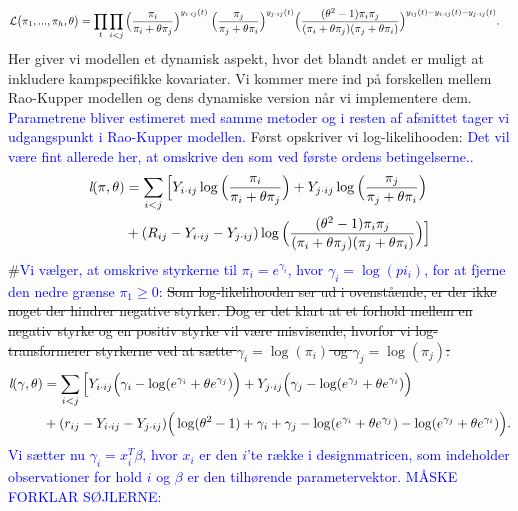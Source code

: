 \documentclass[11pt,a4paper]{article}
\begin{document}
\begin{align*}
\mathcal{L}\big{(}\pi_1,...,\pi_h,\theta\big{)}
&=\prod_t\prod_{i<j}\Big{(}\frac{\pi_i}{\pi_i+\theta\pi_j}\Big{)}^{y_{i\cdot ij}(t)}
\;\Big{(}\frac{\pi_j}{\pi_j+\theta\pi_i}\Big{)}^{y_{j\cdot ij}(t)}
\Big{(}\frac{(\theta^2-1)\pi_i \pi_j}{(\pi_i+\theta\pi_j)(\pi_j+\theta\pi_i)}\Big{)}^{y_{ij}(t)-{y_{i\cdot ij}(t)}-{y_{j\cdot ij}(t)}}.
\end{align*}
Her giver vi modellen et dynamisk aspekt, hvor det blandt andet er muligt at inkludere kampspecifikke kovariater. Vi kommer mere ind på forskellen mellem Rao-Kupper modellen og dens dynamiske version når vi implementere dem. \textcolor{blue}{Parametrene bliver estimeret med samme metoder og i resten af afsnittet tager vi udgangspunkt i Rao-Kupper modellen.} 
Først opskriver vi log-likelihooden: 
\textcolor{blue}{Det vil være fint allerede her, at omskrive den som ved første ordens betingelserne..}
\begin{align*}
\textit{l}(\pi,\theta)
&=\sum_{i<j}\Big{[}Y_{i\cdot ij}\log\Big{(}\frac{\pi_i}{\pi_i+\theta\pi_j}\Big{)}
+ Y_{j\cdot ij}\log\Big{(}\frac{\pi_j}{\pi_j+\theta\pi_i}\Big{)}\\
&+ (R_{ij}-Y_{i\cdot ij}-Y_{j\cdot ij}) \log\Big{(}\frac{(\theta^2-1)\pi_i \pi_j}{(\pi_i+\theta\pi_j)(\pi_j+\theta\pi_i)}\Big{)}\Big{]}
\end{align*}
\#\textcolor{blue}{Vi vælger, at omskrive styrkerne til $\pi_i=e^{\gamma_i}$, hvor $\gamma_i=\log(pi_i)$, for at fjerne den nedre grænse $\pi_1\geq0$:} \sout{Som log-likelihooden ser ud i ovenstående, er der ikke noget der hindrer negative styrker. Dog er det klart at et forhold mellem en negativ styrke og en positiv styrke vil være misvisende, hvorfor vi log-transformerer styrkerne ved at sætte $\gamma_i=\log(\pi_i)$ og $\gamma_j=\log(\pi_j)$:}\\
\begin{align*}
\textit{l}(\gamma,\theta)
&=\sum_{i<j}\Big{[}Y_{i\cdot ij}\Big{(}\gamma_i-\log(e^{\gamma_i}+\theta e^{\gamma_j})\Big{)}
+Y_{j\cdot ij}\Big{(}\gamma_j-\log(e^{\gamma_j}+\theta e^{\gamma_i})\Big{)}\\
& +(r_{ij}-Y_{i\cdot ij}-Y_{j\cdot ij}) \Big{(} \log(\theta^2-1)+\gamma_i+\gamma_j-\log(e^{\gamma_i}+\theta e^{\gamma_j})-\log(e^{\gamma_j}+\theta e^{\gamma_i})\Big{)}.
\end{align*}
\textcolor{blue}{Vi sætter nu $\gamma_i=x_i^T\beta$, hvor $x_i$ er den $i$'te række i designmatricen, som indeholder observationer for hold $i$ og $\beta$ er den tilhørende parametervektor. MÅSKE FORKLAR SØJLERNE:}
\end{document}
